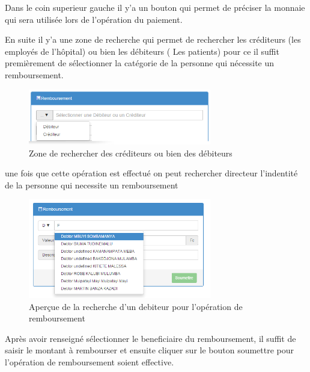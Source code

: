 \documentclass[12pt,a4paper]{report}
\begin{document}
Dans le coin superieur gauche il y'a un bouton qui permet de préciser la monnaie qui sera utilisée lors de l'opération du paiement.

En suite il y'a une zone de recherche qui permet de rechercher  les créditeurs (les employés de l'hôpital) ou bien les débiteurs ( Les patients) pour ce il suffit premièrement de sélectionner la catégorie de la personne qui nécessite un remboursement.


\begin{figure}[h]
\begin{center}
\includegraphics[width=8cm]{pic/SelecCredDeb.png}
\end{center}
\caption{Zone de rechercher des créditeurs ou bien des débiteurs}
\label{Zone de rechercher des créditeurs ou bien des débiteurs}
\end{figure}

\newpage
une fois que cette opération est effectué on peut rechercher directeur l'indentité de la personne qui necessite un remboursement 

\begin{figure}[h]
\begin{center}
\includegraphics[width=8cm]{pic/RembourDebitor.png}
\end{center}
\caption{Aperçue de la recherche d'un debiteur pour l'opération de remboursement}
\label{Aperçue de la recherche d'un debiteur pour l'opération de remboursement}
\end{figure}

Après avoir renseigné sélectionner le beneficiaire du remboursement, il suffit de saisir le montant à rembourser et ensuite cliquer sur le bouton soumettre pour l'opération de remboursement soient effective. 
\end{document}
